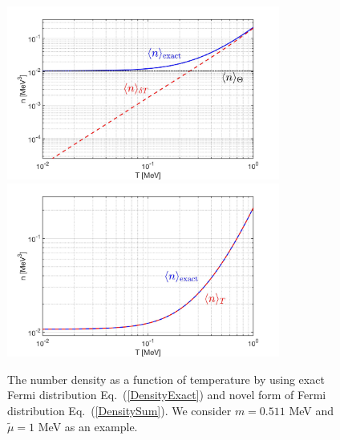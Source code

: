 \documentclass[sn-mathphys,Numbered]{sn-jnl}
\begin{document}
\begin{figure}[ht]
\centering
\includegraphics[width=0.8\textwidth]{./plot/NewFermi_numerical_Exact002}
\includegraphics[width=0.8\textwidth]{./plot/NewFermi_numerical_exact}
\caption{The number density as a function of temperature by using exact Fermi distribution Eq.~(\ref{DensityExact}) and novel form of Fermi distribution Eq.~(\ref{DensitySum}). We consider $m=0.511$ MeV and $\tilde\mu=1$ MeV as an example. }
\label{Density_checking}
\end{figure}




\end{document}
